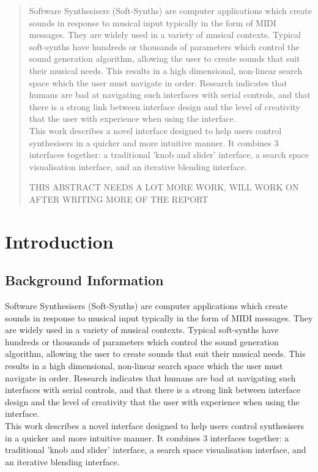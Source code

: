 \documentclass[11pt, oneside]{report}   	%
\begin{document}
\begin{abstract}
\begin{flushleft}
Software Synthesisers (Soft-Synths) are computer applications which create sounds in response to musical input typically in the form of MIDI messages. They are widely used in a variety of musical contexts. Typical soft-synths have hundreds or thousands of parameters which control the sound generation algorithm, allowing the user to create sounds that suit their musical needs. This results in a high dimensional, non-linear search space which the user must navigate in order. Research indicates that humans are bad at navigating such interfaces with serial controls, and that there is a strong link between interface design and the level of creativity that the user with experience when using the interface. \\
This work describes a novel interface designed to help users control synthesisers in a quicker and more intuitive manner. It combines 3 interfaces together: a traditional 'knob and slider' interface, a search space visualisation interface, and an iterative blending interface.

THIS ABSTRACT NEEDS A LOT MORE WORK, WILL WORK ON AFTER WRITING MORE OF THE REPORT
\end{flushleft}
\end{abstract}


\tableofcontents
\clearpage
{}
\setcounter{page}{1}


\chapter{Introduction}
\section{Background Information}
Software Synthesisers (Soft-Synths) are computer applications which create sounds in response to musical input typically in the form of MIDI messages. They are widely used in a variety of musical contexts. Typical soft-synths have hundreds or thousands of parameters which control the sound generation algorithm, allowing the user to create sounds that suit their musical needs. This results in a high dimensional, non-linear search space which the user must navigate in order. Research indicates that humans are bad at navigating such interfaces with serial controls, and that there is a strong link between interface design and the level of creativity that the user with experience when using the interface. \\
This work describes a novel interface designed to help users control synthesisers in a quicker and more intuitive manner. It combines 3 interfaces together: a traditional 'knob and slider' interface, a search space visualisation interface, and an iterative blending interface.
\end{document}
